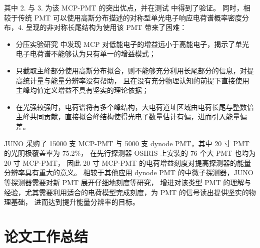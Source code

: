 其中 2. 与 3. 为该 MCP-PMT 的突出优点，并在测试\cite{zhangPerformanceEvaluation8inch2023} 中得到了验证。
同时，相较于传统 PMT 可以使用高斯分布描述的对称型单光电子响应电荷谱概率密度分布，4. 呈现的非对称长尾结构为使用该 PMT 带来了困难：
\begin{itemize}
    \item 分压实验研究\cite{yangMCPPerformanceImprovement2017} 中发现 MCP 对低能电子的增益远小于高能电子，揭示了单光电子电荷谱不能够认为只有单一的增益模式；
    \item 只截取主峰部分使用高斯分布拟合，则不能够充分利用长尾部分的信息，对提高统计量与能量分辨率没有帮助，
    且在没有充分物理认知的前提下直接使用主峰均值定义增益不具有坚实的理论依据；
    \item 在光强较强时，电荷谱将有多个峰结构，大电荷道址区域由电荷长尾与整数倍主峰共同贡献，直接拟合峰结构使得光电子数量估计有偏，进而引入能量偏差。
\end{itemize}

JUNO 采购了 15000 支 MCP-PMT 与 5000 支 dynode PMT，其中 20 寸 PMT 的光阴极覆盖率为 75.2\%，
在先行探测器 OSIRIS 上安装的 76 个大 PMT 也均为 20 寸 MCP-PMT，
因此 20 寸 MCP-PMT 的电荷增益刻度对提高探测器的能量分辨率具有重大的意义。
相较于其他应用 dynode PMT 的中微子探测器，JUNO 等探测器需要对新 PMT 展开仔细地刻度等研究，
增进对该类型 PMT 的理解与经验，尤其需要利用适合的电荷模型完成刻度，为 PMT 的信号读出提供坚实的物理基础，
进而达到提升能量分辨率的目标。

\section{论文工作总结}
